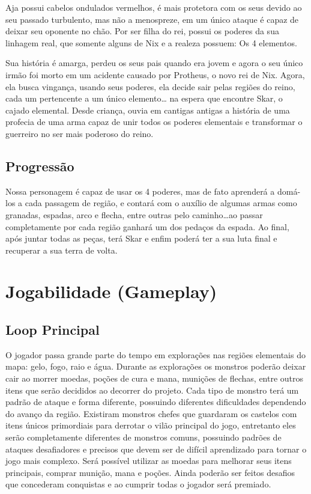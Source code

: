 \documentclass[12pt, a4paper]{article} %
\begin{document}
	Aja possui cabelos ondulados vermelhos, é mais protetora com os seus devido ao seu passado turbulento, mas não a menospreze, em um único ataque é capaz de deixar seu oponente no chão. Por ser filha do rei, possui os poderes da sua linhagem real, que somente alguns de Nix e a realeza possuem: Os 4 elementos.
	
	Sua história é amarga, perdeu os seus pais quando era jovem e agora o seu único irmão foi morto em um acidente causado por Protheus, o novo rei de Nix. Agora, ela busca vingança, usando seus poderes, ela decide sair pelas regiões do reino,  cada um pertencente a um único elemento… na espera que encontre Skar, o cajado elemental. Desde criança, ouvia em cantigas antigas a história de uma profecia de uma arma capaz de unir todos os poderes elementais e transformar o guerreiro no ser mais poderoso do reino. 
	
	\subsection{Progressão}
	
	Nossa personagem é capaz de usar os 4 poderes, mas de fato aprenderá a domá-los a cada passagem de região, e contará com o auxílio de algumas armas como granadas, espadas, arco e flecha, entre outras pelo caminho…ao passar completamente por cada região ganhará um dos pedaços da espada. Ao final, após juntar todas as peças, terá Skar e enfim poderá ter a sua luta final e recuperar a sua terra de volta.  
	
	\newpage    
	
	
	\section{Jogabilidade (Gameplay)}
	
	\subsection{Loop Principal}
	
	O jogador passa grande parte do tempo em explorações nas regiões elementais do mapa: gelo, fogo, raio e água.
	Durante as explorações os monstros poderão deixar cair ao morrer moedas, poções de cura e mana, munições de flechas, entre outros itens que serão decididos ao decorrer do projeto.
	Cada tipo de monstro terá um padrão de ataque e forma diferente, possuindo diferentes dificuldades dependendo do avanço da região.
	Existiram monstros chefes que guardaram os castelos com itens únicos primordiais para derrotar o vilão principal do jogo, entretanto eles serão completamente diferentes de monstros comuns, possuindo padrões de ataques desafiadores e precisos que devem ser de difícil aprendizado para tornar o jogo mais complexo. 
	Será possível utilizar as moedas para melhorar seus itens principais, comprar munição, mana e poções.
	Ainda poderão ser feitos desafios que concederam conquistas e ao cumprir todas o jogador será premiado.
	
\end{document}
